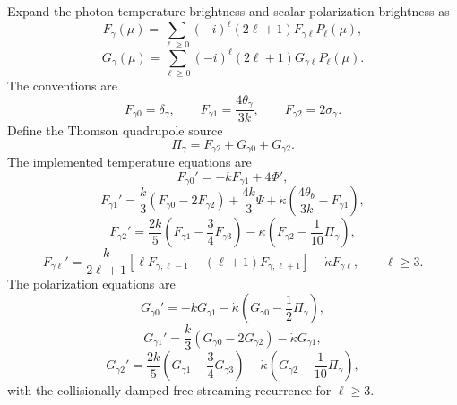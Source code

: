 Expand the photon temperature brightness and scalar polarization brightness as
\begin{equation}
 F_\gamma(\mu)=\sum_{\ell\geq0}(-i)^\ell(2\ell+1)F_{\gamma\ell}P_\ell(\mu),
 \label{eq:pcmb-photon-expansion}
\end{equation}
\begin{equation}
 G_\gamma(\mu)=\sum_{\ell\geq0}(-i)^\ell(2\ell+1)G_{\gamma\ell}P_\ell(\mu).
 \label{eq:pcmb-polarization-expansion}
\end{equation}
The conventions are
\begin{equation}
 F_{\gamma0}=\delta_\gamma,
 \qquad
 F_{\gamma1}=\frac{4\theta_\gamma}{3k},
 \qquad
 F_{\gamma2}=2\sigma_\gamma.
 \label{eq:pcmb-photon-moment-convention}
\end{equation}
Define the Thomson quadrupole source
\begin{equation}
 \Pi_\gamma=F_{\gamma2}+G_{\gamma0}+G_{\gamma2}.
 \label{eq:pcmb-pi-source}
\end{equation}
The implemented temperature equations are
\begin{equation}
 F_{\gamma0}'=-kF_{\gamma1}+4\Phi',
 \label{eq:pcmb-gamma-zero}
\end{equation}
\begin{equation}
 F_{\gamma1}'
 =\frac{k}{3}(F_{\gamma0}-2F_{\gamma2})
 +\frac{4k}{3}\Psi
 +\dot\kappa\left(\frac{4\theta_b}{3k}-F_{\gamma1}\right),
 \label{eq:pcmb-gamma-one}
\end{equation}
\begin{equation}
 F_{\gamma2}'
 =\frac{2k}{5}\left(F_{\gamma1}-\frac34F_{\gamma3}\right)
 -\dot\kappa\left(F_{\gamma2}-\frac1{10}\Pi_\gamma\right),
 \label{eq:pcmb-gamma-two}
\end{equation}
\begin{equation}
 F_{\gamma\ell}'
 =\frac{k}{2\ell+1}
 \left[\ell F_{\gamma,\ell-1}-(\ell+1)F_{\gamma,\ell+1}\right]
 -\dot\kappa F_{\gamma\ell},
 \qquad \ell\geq3.
 \label{eq:pcmb-gamma-general}
\end{equation}
The polarization equations are
\begin{equation}
 G_{\gamma0}'
 =-kG_{\gamma1}
 -\dot\kappa\left(G_{\gamma0}-\frac12\Pi_\gamma\right),
 \label{eq:pcmb-pol-zero}
\end{equation}
\begin{equation}
 G_{\gamma1}'
 =\frac{k}{3}(G_{\gamma0}-2G_{\gamma2})-\dot\kappa G_{\gamma1},
 \label{eq:pcmb-pol-one}
\end{equation}
\begin{equation}
 G_{\gamma2}'
 =\frac{2k}{5}\left(G_{\gamma1}-\frac34G_{\gamma3}\right)
 -\dot\kappa\left(G_{\gamma2}-\frac1{10}\Pi_\gamma\right),
 \label{eq:pcmb-pol-two}
\end{equation}
with the collisionally damped free-streaming recurrence for $\ell\geq3$.

